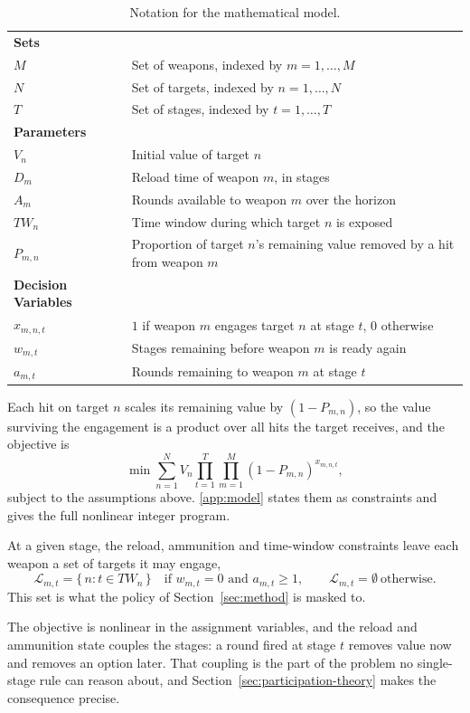 \begin{table}[H]
\centering
\small
\caption{Notation for the mathematical model.}
\label{tab:notation}
\begin{tabular}{lp{6.5cm}}
\hline
\textbf{Sets} & \\
$M$ & Set of weapons, indexed by $m = 1, \ldots, M$ \\
$N$ & Set of targets, indexed by $n = 1, \ldots, N$ \\
$T$ & Set of stages, indexed by $t = 1, \ldots, T$ \\
\hline
\textbf{Parameters} & \\
$V_n$ & Initial value of target $n$ \\
$D_m$ & Reload time of weapon $m$, in stages \\
$A_m$ & Rounds available to weapon $m$ over the horizon \\
$TW_n$ & Time window during which target $n$ is exposed \\
$P_{m,n}$ & Proportion of target $n$'s remaining value removed by a hit from weapon $m$ \\
\hline
\textbf{Decision Variables} & \\
$x_{m,n,t}$ & $1$ if weapon $m$ engages target $n$ at stage $t$, $0$ otherwise \\
$w_{m,t}$ & Stages remaining before weapon $m$ is ready again \\
$a_{m,t}$ & Rounds remaining to weapon $m$ at stage $t$ \\
\hline
\end{tabular}
\end{table}

Each hit on target $n$ scales its remaining value by $(1 - P_{m,n})$, so the
value surviving the engagement is a product over all hits the target
receives, and the objective is
\begin{equation}\label{eq:objective_function}
    \min \sum_{n=1}^{N} V_{n} \prod_{t=1}^{T} \prod_{m=1}^{M} (1 - P_{m,n})^{x_{m,n,t}},
\end{equation}
subject to the assumptions above. \ref{app:model} states them as constraints
and gives the full nonlinear integer program.

At a given stage, the reload, ammunition and time-window constraints leave
each weapon a set of targets it may engage,
\begin{equation}\label{eq:legal-set}
    \mathcal{L}_{m,t} = \{\, n : t \in TW_n \,\} \quad \text{if } w_{m,t} = 0 \text{ and } a_{m,t} \geq 1, \qquad \mathcal{L}_{m,t} = \emptyset \ \text{otherwise}.
\end{equation}
This set is what the policy of Section~\ref{sec:method} is masked to.

The objective is nonlinear in the assignment variables, and the reload and
ammunition state couples the stages: a round fired at stage $t$ removes value
now and removes an option later. That coupling is the part of the problem no
single-stage rule can reason about, and Section~\ref{sec:participation-theory} makes the
consequence precise.
